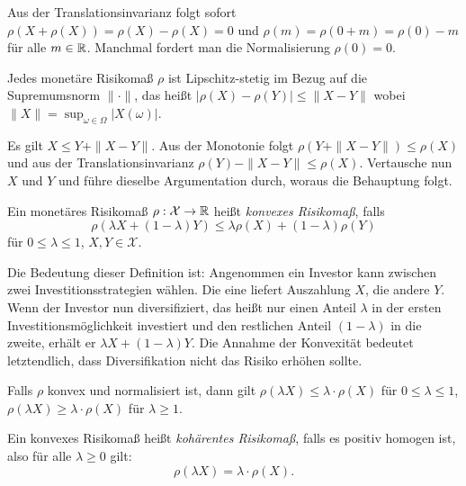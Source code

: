 \documentclass[a4paper,twoside,DIV15,BCOR12mm]{scrbook}
\newcommand{\cX}{\mathcal X}
\begin{document}
Aus der Translationsinvarianz folgt sofort $\rho(X + \rho(X)) = \rho(X) - \rho(X) = 0$ und $\rho(m) = \rho(0+m) = \rho(0) - m$ für alle $m\in\mathbb{R}$. Manchmal fordert man die Normalisierung $\rho(0)=0$.

\begin{satz}
Jedes monetäre Risikomaß $\rho$ ist Lipschitz-stetig im Bezug auf die Supremumsnorm $\|\cdot\|$, das heißt $|\rho(X) -\rho(Y)|\le \|X-Y\|$ wobei $\|X\| = \sup_{\omega\in\Omega}|X(\omega)|$. 
\end{satz}

\begin{beweis}
Es gilt $X\le Y+\|X-Y\|$. Aus der Monotonie folgt $\rho(Y+\|X-Y\|) \le \rho(X)$ und aus der Translationsinvarianz $\rho(Y)-\|X-Y\| \le \rho(X)$. Vertausche nun $X$ und $Y$ und führe dieselbe Argumentation durch, woraus die Behauptung folgt.
\end{beweis}

\begin{definition}
Ein monetäres Risikomaß $\rho:\cX \to \MdR$ heißt \emph{konvexes Risikomaß}, falls 
\[
\rho(\lambda X + (1-\lambda)Y) \le \lambda \rho(X) + (1- \lambda)\rho(Y)
\]
für $0\le \lambda \le 1$, $X,Y\in\cX$.
\end{definition}

Die Bedeutung dieser Definition ist: Angenommen ein Investor kann zwischen zwei Investitionsstrategien wählen. Die eine liefert Auszahlung $X$, die andere $Y$. Wenn der Investor nun diversifiziert, das heißt nur einen Anteil $\lambda$ in der ersten Investitionsmöglichkeit investiert und den restlichen Anteil $(1-\lambda)$ in die zweite, erhält er $\lambda X + (1-\lambda)Y$. Die Annahme der Konvexität bedeutet letztendlich, dass Diversifikation nicht das Risiko erhöhen sollte.

Falls $\rho$ konvex und normalisiert ist, dann gilt $\rho(\lambda X)\leq \lambda \cdot \rho(X)$ für $0\leq\lambda\leq 1$, $\rho(\lambda X)\geq \lambda \cdot \rho(X)$ für $\lambda\geq 1$.

\begin{definition}
Ein konvexes Risikomaß heißt \emph{kohärentes Risikomaß}, falls es positiv homogen ist, also für alle $\lambda\geq 0$ gilt: 
\[
\rho(\lambda X)=\lambda\cdot \rho (X).
\]
\end{definition}
\end{document}
